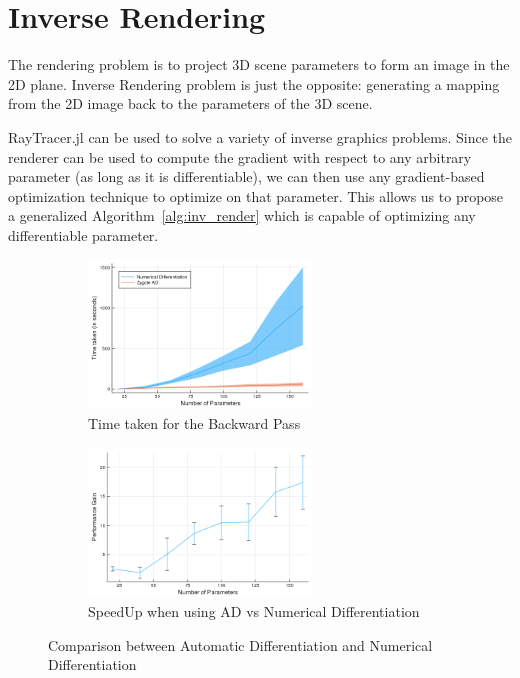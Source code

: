 \documentclass{juliacon}
\begin{document}
\section{Inverse Rendering}

The rendering problem is to project 3D scene parameters to form an image in the 2D plane. Inverse Rendering problem is just the opposite: generating a mapping from the 2D image back to the parameters of the 3D scene.

RayTracer.jl can be used to solve a variety of inverse graphics problems. Since the renderer can be used to compute the gradient with respect to any arbitrary parameter (as long as it is differentiable), we can then use any gradient-based optimization technique to optimize on that parameter. This allows us to propose a generalized Algorithm~\ref{alg:inv_render} which is capable of optimizing any differentiable parameter.

\begin{figure}
    \centering
    \begin{subfigure}[c]{0.48\textwidth}
        \includegraphics[width=\linewidth, height=150px]{images/differentiation.png}
        \caption{Time taken for the Backward Pass}
        \label{fig:ad_perf}
    \end{subfigure}
    \hfill
    \begin{subfigure}[c]{0.48\textwidth}
        \includegraphics[width=\linewidth, height=150px]{images/performance_gain_error.png}
        \caption{SpeedUp when using AD vs Numerical Differentiation}
        \label{fig:ad_perf_err}
    \end{subfigure}
    \caption{Comparison between Automatic Differentiation and Numerical Differentiation}
    \label{fig:ad_better}
\end{figure}
\end{document}
